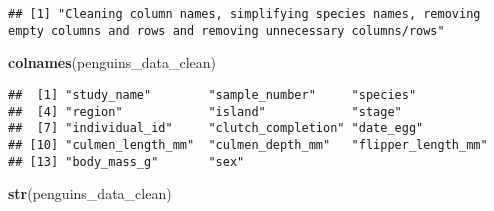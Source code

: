 \documentclass[
]{article}
\newenvironment{Shaded}{\begin{snugshade}}{\end{snugshade}}
\newcommand{\FunctionTok}[1]{\textcolor[rgb]{0.13,0.29,0.53}{\textbf{#1}}}
\newcommand{\NormalTok}[1]{#1}
\begin{document}
\begin{verbatim}
## [1] "Cleaning column names, simplifying species names, removing empty columns and rows and removing unnecessary columns/rows"
\end{verbatim}

\begin{Shaded}
\begin{Highlighting}[]
\FunctionTok{colnames}\NormalTok{(penguins\_data\_clean)}
\end{Highlighting}
\end{Shaded}

\begin{verbatim}
##  [1] "study_name"        "sample_number"     "species"          
##  [4] "region"            "island"            "stage"            
##  [7] "individual_id"     "clutch_completion" "date_egg"         
## [10] "culmen_length_mm"  "culmen_depth_mm"   "flipper_length_mm"
## [13] "body_mass_g"       "sex"
\end{verbatim}

\begin{Shaded}
\begin{Highlighting}[]
\FunctionTok{str}\NormalTok{(penguins\_data\_clean)}
\end{Highlighting}
\end{Shaded}
\end{document}
